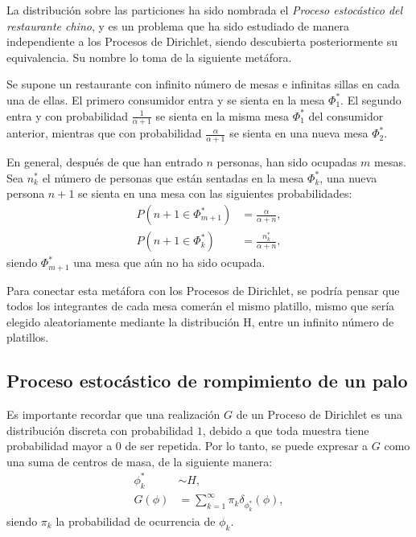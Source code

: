 La distribuci\'on sobre las particiones ha sido nombrada el \textit{Proceso estoc\'astico del restaurante chino}, y es un problema que ha sido estudiado de manera independiente a los Procesos de Dirichlet, siendo descubierta posteriormente su equivalencia. Su nombre lo toma de la siguiente met\'afora.

Se supone un restaurante con infinito n\'umero de mesas e infinitas sillas en cada una de ellas. El primero consumidor entra y se sienta en la mesa $\Phi_1^*$. El segundo entra y con probabilidad $\frac{1}{\alpha + 1}$ se sienta en la misma mesa $\Phi_1^*$ del consumidor anterior, mientras que con probabilidad $\frac{\alpha}{\alpha+1}$ se sienta en una nueva mesa $\Phi_2^*$. 

En general, despu\'es de que han entrado $n$ personas, han sido ocupadas $m$ mesas. Sea $n_k^*$ el n\'umero de personas que est\'an sentadas en la mesa $\Phi_k^*$, una nueva persona $n+1$ se sienta en una mesa con las siguientes probabilidades:
\begin{equation*}
\begin{aligned}
   P(n+1 \in \Phi_{m+1}^*) &= \frac{\alpha}{\alpha + n},\\
    P(n+1 \in \Phi_{k}^*) &= \frac{n_k^*}{\alpha + n},
\end{aligned}
\end{equation*}
siendo $\Phi_{m+1}^*$ una mesa que a\'un no ha sido ocupada.

Para conectar esta met\'afora con los Procesos de Dirichlet, se podr\'ia pensar que todos los integrantes de cada mesa comer\'an el mismo platillo, mismo que ser\'ia elegido aleatoriamente mediante la distribuci\'on H, entre un infinito n\'umero de platillos.

\subsection{Proceso estoc\'astico de rompimiento de un palo}
Es importante recordar que una realizaci\'on $G$ de un Proceso de Dirichlet es una distribuci\'on discreta con probabilidad $1$, debido a que toda muestra tiene probabilidad mayor a $0$ de ser repetida. Por lo tanto, se puede expresar a $G$ como una suma de centros de masa, de la siguiente manera:
\begin{equation*}
\begin{aligned}
   \phi_k^* &\sim H, \\
   G(\phi) &= \sum_{k=1}^\infty \pi_k \delta_{\phi_k^*}(\phi),
\end{aligned}
\end{equation*}
siendo $\pi_k$ la probabilidad de ocurrencia de $\phi_k$.

